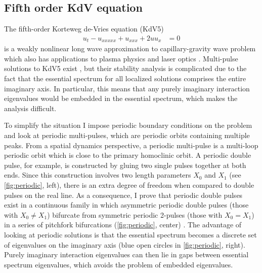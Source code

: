 \documentclass[12pt,reqno,oneside,hidelinks]{article}
\begin{document}
\subsection*{Fifth order KdV equation}

The fifth-order Korteweg de-Vries equation (KdV5)
\begin{align*}
    u_t - u_{xxxxx} + u_{xxx} + 2 u u_x &= 0
\end{align*} 
is a weakly nonlinear long wave approximation to capillary-gravity wave problem which also has applications to plasma physics and laser optics \cite{Pelinovsky2007}. Multi-pulse solutions to KdV5 exist \cite{SandstedeStrut}, but their stability analysis is complicated due to the fact that the essential spectrum for all localized solutions comprises the entire imaginary axis. In particular, this means that any purely imaginary interaction eigenvalues would be embedded in the essential spectrum, which makes the analysis difficult.

To simplify the situation I impose periodic boundary conditions on the problem and look at periodic multi-pulses, which are periodic orbits containing multiple peaks. From a spatial dynamics perspective, a periodic multi-pulse is a multi-loop periodic orbit which is close to the primary homoclinic orbit. A periodic double pulse, for example, is constructed by gluing two single pulses together at both ends. Since this construction involves two length parameters $X_0$ and $X_1$ (see \cref{fig:periodic}, left), there is an extra degree of freedom when compared to double pulses on the real line. As a consequence, I prove that periodic double pulses exist in a continuous family in which asymmetric periodic double pulses (those with $X_0 \neq X_1$) bifurcate from symmetric periodic 2-pulses (those with $X_0 = X_1$) in a series of pitchfork bifurcations (\cref{fig:periodic}, center) \cite{ParkerKdV}. The advantage of looking at periodic solutions is that the essential spectrum becomes a discrete set of eigenvalues on the imaginary axis (blue open circles in \cref{fig:periodic}, right). Purely imaginary interaction eigenvalues can then lie in gaps between essential spectrum eigenvalues, which avoids the problem of embedded eigenvalues. 
\end{document}

